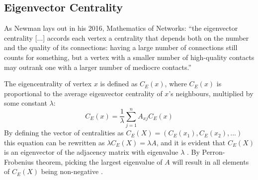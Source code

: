 \subsection{Eigenvector Centrality}\label{sec:EigCentrality}

As Newman lays out in his 2016, Mathematics of Networks: ``the eigenvector
centrality [...] accords each vertex a centrality that depends both on the
number and the quality of its connections: having a large number of connections
still counts for something, but a vertex with a smaller number of high-quality
contacts may outrank one with a larger number of mediocre contacts.''
\cite{newman2008mathematics}

The eigencentrality of vertex $x$ is defined as $C_{E}(x)$, where $C_{E}(x)$ is
proportional to the average eigenvector centrality of $x$'s neighbours,
multiplied by some constant $\lambda$:
\begin{equation}
    C_{E}(x)=\frac{1}{\lambda}\sum_{j=1}^{n}A_{xj}C_{E}(x)
\end{equation}
By defining the vector of centralities as $C_E(X) = (C_E(x_1),C_E(x_2),...)$
this equation can be rewritten as $\lambda C_E(X) = \lambda A$, and it is
evident that $C_E(X)$ is an eigenvector of the adjacency matrix with eigenvalue
$\lambda$ \cite{newman2008mathematics}. By Perron-Frobenius theorem, picking the
largest eigenvalue of $A$ will result in all elements of $C_E(X)$ being
non-negative \cite{newman2008mathematics}.